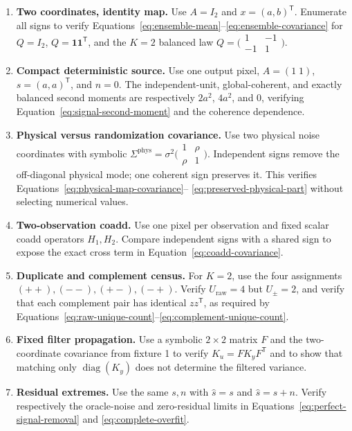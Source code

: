 \documentclass[11pt]{article}
\newcommand{\diag}{\operatorname{diag}}
\newcommand{\one}{\bm{1}}
\begin{document}
\begin{enumerate}
\item \textbf{Two coordinates, identity map.}  Use $A=I_2$ and
$x=(a,b)^{\mathsf T}$.  Enumerate all signs to verify
Equations~\eqref{eq:ensemble-mean}--\eqref{eq:ensemble-covariance} for
$Q=I_2$, $Q=\one\one^{\mathsf T}$, and the $K=2$ balanced law
$Q=\bigl(\begin{smallmatrix}1&-1\\-1&1\end{smallmatrix}\bigr)$.

\item \textbf{Compact deterministic source.}  Use one output pixel,
$A=(1\;1)$, $s=(a,a)^{\mathsf T}$, and $n=0$.  The independent-unit,
global-coherent, and exactly balanced second moments are respectively
$2a^2$, $4a^2$, and $0$, verifying
Equation~\eqref{eq:signal-second-moment} and the coherence dependence.

\item \textbf{Physical versus randomization covariance.}  Use two physical
noise coordinates with symbolic
$\Sigma^{\mathrm{phys}}=\sigma^2
\bigl(\begin{smallmatrix}1&\rho\\\rho&1\end{smallmatrix}\bigr)$.
Independent signs remove the off-diagonal physical mode; one coherent sign
preserves it.  This verifies Equations~\eqref{eq:physical-map-covariance}--
\eqref{eq:preserved-physical-part} without selecting numerical values.

\item \textbf{Two-observation coadd.}  Use one pixel per observation and
fixed scalar coadd operators $H_1,H_2$.  Compare independent signs with a
shared sign to expose the exact cross term in
Equation~\eqref{eq:coadd-covariance}.

\item \textbf{Duplicate and complement census.}  For $K=2$, use the four
assignments $(++),(--),(+-),(-+)$.  Verify $U_{\mathrm{raw}}=4$ but
$U_{\pm}=2$, and verify that each complement pair has identical
$zz^{\mathsf T}$, as required by
Equations~\eqref{eq:raw-unique-count}--\eqref{eq:complement-unique-count}.

\item \textbf{Fixed filter propagation.}  Use a symbolic $2\times2$ matrix
$F$ and the two-coordinate covariance from fixture 1 to verify
$K_u=FK_yF^{\mathsf T}$ and to show that matching only
$\diag(K_y)$ does not determine the filtered variance.

\item \textbf{Residual extremes.}  Use the same $s,n$ with
$\widehat s=s$ and $\widehat s=s+n$.  Verify respectively the oracle-noise and
zero-residual limits in Equations~\eqref{eq:perfect-signal-removal} and
\eqref{eq:complete-overfit}.
\end{enumerate}
\end{document}
